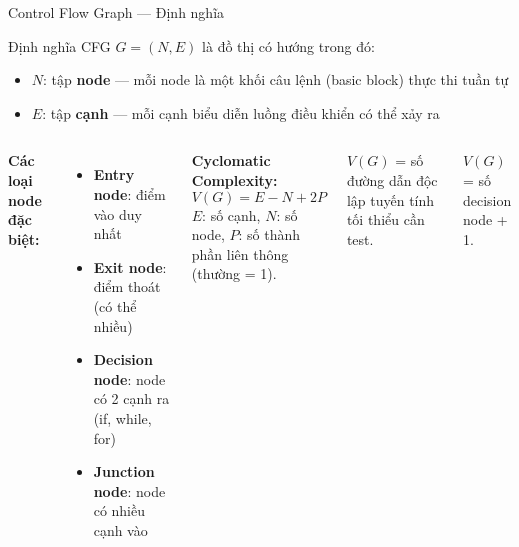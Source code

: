 \documentclass[aspectratio=169,12pt]{beamer}
\begin{document}
\begin{frame}[fragile,shrink=12]{Control Flow Graph --- Định nghĩa}
  \begin{block}{Định nghĩa}
    CFG $G = (N, E)$ là đồ thị có hướng trong đó:
    \begin{itemize}
      \item $N$: tập \textbf{node} --- mỗi node là một khối câu lệnh
            (basic block) thực thi tuần tự
      \item $E$: tập \textbf{cạnh} --- mỗi cạnh biểu diễn
            luồng điều khiển có thể xảy ra
    \end{itemize}
  \end{block}

  \vspace{0.4em}
  \begin{columns}
    \textbf{Các loại node đặc biệt:}
    \begin{itemize}
      \item \textbf{Entry node}: điểm vào duy nhất
      \item \textbf{Exit node}: điểm thoát (có thể nhiều)
      \item \textbf{Decision node}: node có 2 cạnh ra (if, while, for)
      \item \textbf{Junction node}: node có nhiều cạnh vào
    \end{itemize}

    \textbf{Cyclomatic Complexity:}
    \[
      V(G) = E - N + 2P
    \]
    $E$: số cạnh, $N$: số node, $P$: số thành phần liên thông (thường = 1).

    \vspace{0.3em}
    $V(G)$ = số đường dẫn độc lập tuyến tính tối thiểu cần test.

    \vspace{0.3em}
    $V(G)$ = số decision node + 1.
  \end{columns}
\end{frame}
\end{document}
